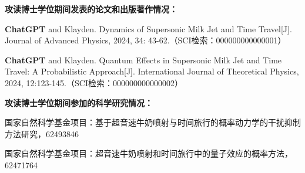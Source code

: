 \begin{publications}{99}

\item[] {{\songti{}\bf{攻读博士学位期间发表的论文和出版著作情况：}}}
\item \textbf{ChatGPT} and Klayden. Dynamics of Supersonic Milk Jet and Time Travel[J]. Journal of Advanced Physics, 2024, 34: 43-62.（SCI检索：000000000000001）
\item \textbf{ChatGPT} and Klayden. Quantum Effects in Supersonic Milk Jet and Time Travel: A Probabilistic Approach[J]. International Journal of Theoretical Physics, 2024, 12:123-145.（SCI检索：000000000000002）
\vspace{1.0cm}

\item[] {{\songti{}\bf{攻读博士学位期间参加的科学研究情况：}}}
\setcounter{enumiv}{0}
\item 国家自然科学基金项目：基于超音速牛奶喷射与时间旅行的概率动力学的干扰抑制方法研究，62493846
\item 国家自然科学基金项目：超音速牛奶喷射和时间旅行中的量子效应的概率方法，62471764

\end{publications}



